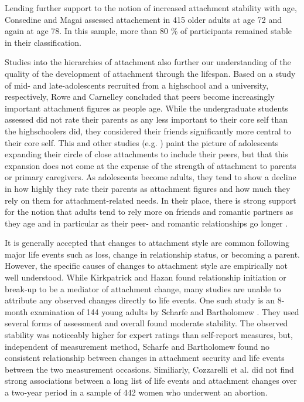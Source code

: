 \documentclass[12pt]{report}
\begin{document}
Lending further support to the notion of increased attachment stability with age, Consedine and Magai assessed attachement in 415 older adults at age 72 and again at age 78. In this sample, more than 80 \% of participants remained stable in their classification.

Studies into the hierarchies of attachment also further our understanding of the quality of the development of attachment through the lifespan.
Based on a study of mid- and late-adolescents recruited from a highschool and a university, respectively, Rowe and Carnelley \cite{Rowe2005} concluded that peers become increasingly important attachment figures as people age. While the undergraduate students assessed did not rate their parents as any less important to their core self than the highschoolers did, they considered their friends significantly more central to their core self.
This and other studies (e.g. \cite{Fraley1997,Doherty2004}) paint the picture of adolescents expanding their circle of close attachments to include their peers, but that this expansion does not come at the expense of the strength of attachment to parents or primary caregivers.
As adolescents become adults, they tend to show a decline in how highly they rate their parents as attachment figures and how much they rely on them for attachment-related needs. In their place, there is strong support for the notion that adults tend to rely more on friends and romantic partners as they age and in particular as their peer- and romantic relationships go longer \cite{Tancredy2006,Doherty2004,Fraley1997}.

It is generally accepted that changes to attachment style are common following major life events such as loss, change in relationship status, or becoming a parent. However, the specific causes of changes to attachment style are empirically not well understood. While Kirkpatrick and Hazan \cite{Kirkpatrick1994} found relationship initiation or break-up to be a mediator of attachment change, many studies are unable to attribute any observed changes directly to life events.
One such study is an 8-month examination of 144 young adults by Scharfe and Bartholomew \cite{Scharfe1994}. They used several forms of assessment and overall found moderate stability. The observed stability was noticeably higher for expert ratings than self-report measures, but, independent of measurement method, Scharfe and Bartholomew found no consistent relationship between changes in attachment security and life events between the two measurement occasions.
Similiarly, Cozzarelli et al. \cite{Cozzarelli2003} did not find strong associations between a long list of life events and attachment changes over a two-year period in a sample of 442 women who underwent an abortion.
\end{document}
